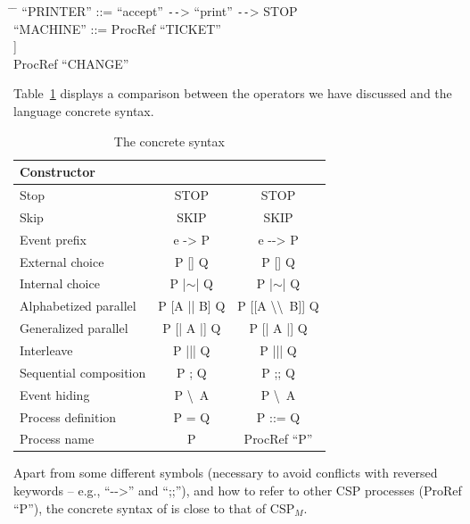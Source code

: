 \begin{tabbing}
	\hspace*{1em}\= \hspace*{6.4em} \= \kill
	``PRINTER'' ::= ``accept'' \texttt{-{}-}> ``print'' \texttt{-{}-}> STOP\\

	``MACHINE'' ::= ProcRef ``TICKET''\\
	\>\> [[ \{\{``cash'', ``ticket''\}\} \textbackslash\textbackslash \ \{\{``cash'', ``change''\}\} ]]\\
	\>\> ProcRef ``CHANGE''
\end{tabbing}

Table~\ref{tab:cspm-csp_coq} displays a comparison between the \CSPM{} operators we have discussed and the \CSPcoq{} language concrete syntax.

\begin{table}[htb]
	\begin{center}
		\caption[The \CSPcoq{} concrete syntax]{The \CSPcoq{} concrete syntax}
		\label{tab:cspm-csp_coq}
		\begin{tabular}{ |l|c|c| }
			\hline
			Constructor & \CSPM{} & \CSPcoq{} \\
			\hline
			Stop & STOP & STOP \\ [0.5ex]
			Skip & SKIP & SKIP \\ [0.5ex]
			Event prefix & e -> P & e -{}-> P \\  [0.5ex]
			External choice & P [] Q & P [] Q \\  [0.5ex]
			Internal choice & P |$ \sim $| Q & P |$ \sim $| Q \\ [0.5ex]
			Alphabetized parallel & P [A || B] Q & P [[A \textbackslash\textbackslash \ B]] Q \\ [0.5ex]
			Generalized parallel & P [| A |] Q & P [| A |] Q \\ [0.5ex]
			Interleave & P ||| Q & P ||| Q \\ [0.5ex]
			Sequential composition & P ; Q & P ;; Q \\ [0.5ex]
			Event hiding & P \textbackslash \ A & P \textbackslash \ A \\ [0.5ex]
			Process definition & P = Q & P ::= Q \\ [0.5ex]
			Process name & P & ProcRef ``P'' \\ [0.5ex]
			\hline
		\end{tabular}
	\end{center}
\end{table}

Apart from some different symbols (necessary to avoid conflicts with reversed keywords -- e.g., ``-{}->'' and ``;;''), and how to refer to other CSP processes (ProRef ``P''), the concrete syntax of \CSPcoq{} is close to that of CSP$_{M}$.

